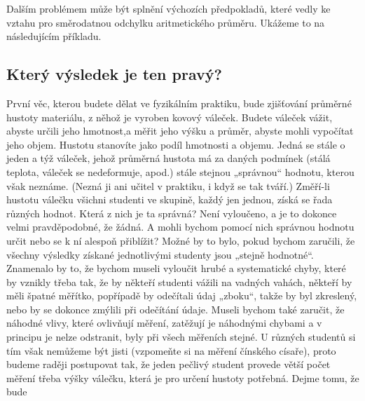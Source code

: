       Dalším problémem může být splnění výchozích předpokladů, které vedly ke vztahu pro
      směrodatnou odchylku aritmetického průměru. Ukážeme to na následujícím příkladu.
      
      
      
      
      
    \subsection{Který výsledek je ten pravý?}
      První věc, kterou budete dělat ve fyzikálním praktiku, bude zjišťování průměrné hustoty 
      materiálu, z něhož je vyroben kovový váleček. Budete váleček vážit, abyste určili jeho 
      hmotnost,a měřit jeho výšku a průměr, abyste mohli vypočítat jeho objem. Hustotu stanovíte 
      jako podíl hmotnosti a objemu. Jedná se stále o jeden a týž váleček, jehož průměrná hustota 
      má za daných podmínek (stálá teplota, váleček se nedeformuje, apod.) stále stejnou „správnou“ 
      hodnotu, kterou však neznáme. (Nezná ji ani učitel v praktiku, i když se tak tváří.) Změří-li 
      hustotu válečku všichni studenti ve skupině, každý jen jednou, získá se řada různých hodnot. 
      Která z nich je ta správná? Není vyloučeno, a je to dokonce velmi pravděpodobné, že žádná. A 
      mohli bychom pomocí nich správnou hodnotu určit nebo se k ní alespoň přiblížit? Možné by to 
      bylo, pokud bychom zaručili, že všechny výsledky získané jednotlivými studenty jsou „stejně 
      hodnotné“. Znamenalo by to, že bychom museli vyloučit hrubé a systematické chyby, které by 
      vznikly třeba tak, že by někteří studenti vážili na vadných vahách, někteří by měli špatné 
      měřítko, popřípadě by odečítali údaj „zboku“, takže by byl zkreslený, nebo by se dokonce 
      zmýlili při odečítání údaje. Museli bychom také zaručit, že náhodné vlivy, které ovlivňují 
      měření, zatěžují je náhodnými chybami a v principu je nelze odstranit, byly při všech 
      měřeních stejné. U různých studentů si tím však nemůžeme být jisti (vzpomeňte si na měření 
      čínského císaře), proto budeme raději postupovat tak, že jeden pečlivý student provede větší 
      počet měření třeba výšky válečku, která je pro určení hustoty potřebná. Dejme tomu, že bude 

